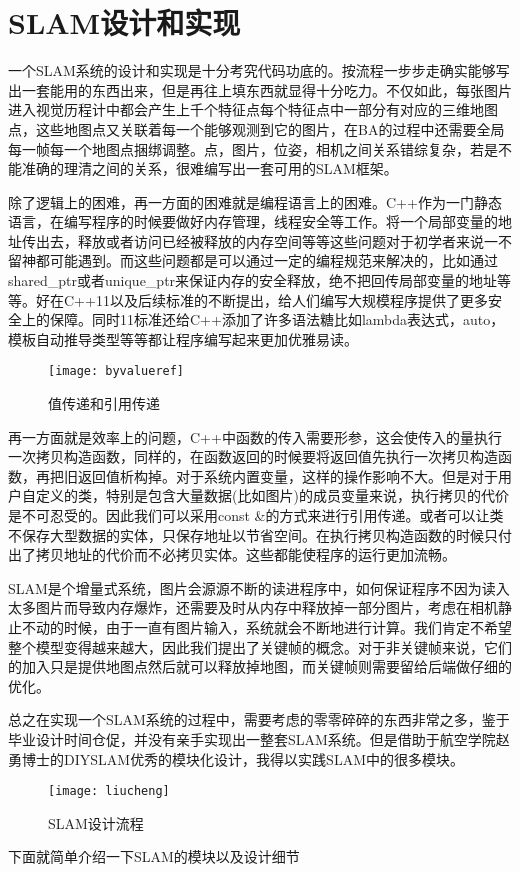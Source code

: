 \chapter{SLAM设计和实现}
一个SLAM系统的设计和实现是十分考究代码功底的。按流程一步步走确实能够写出一套能用的东西出来，但是再往上填东西就显得十分吃力。不仅如此，每张图片进入视觉历程计中都会产生上千个特征点每个特征点中一部分有对应的三维地图点，这些地图点又关联着每一个能够观测到它的图片，在BA的过程中还需要全局每一帧每一个地图点捆绑调整。点，图片，位姿，相机之间关系错综复杂，若是不能准确的理清之间的关系，很难编写出一套可用的SLAM框架。\par
除了逻辑上的困难，再一方面的困难就是编程语言上的困难。C++作为一门静态语言，在编写程序的时候要做好内存管理，线程安全等工作。将一个局部变量的地址传出去，释放或者访问已经被释放的内存空间等等这些问题对于初学者来说一不留神都可能遇到。而这些问题都是可以通过一定的编程规范来解决的，比如通过shared\_ptr或者unique\_ptr来保证内存的安全释放，绝不把回传局部变量的地址等等。好在C++11以及后续标准的不断提出，给人们编写大规模程序提供了更多安全上的保障。同时11标准还给C++添加了许多语法糖比如lambda表达式，auto，模板自动推导类型等等都让程序编写起来更加优雅易读。\par
\begin{figure}[H]
	\centering
	\texttt{[image: byvalueref]}
	\caption{值传递和引用传递}
\end{figure}
再一方面就是效率上的问题，C++中函数的传入需要形参，这会使传入的量执行一次拷贝构造函数，同样的，在函数返回的时候要将返回值先执行一次拷贝构造函数，再把旧返回值析构掉。对于系统内置变量，这样的操作影响不大。但是对于用户自定义的类，特别是包含大量数据(比如图片)的成员变量来说，执行拷贝的代价是不可忍受的。因此我们可以采用const \&的方式来进行引用传递。或者可以让类不保存大型数据的实体，只保存地址以节省空间。在执行拷贝构造函数的时候只付出了拷贝地址的代价而不必拷贝实体。这些都能使程序的运行更加流畅。\par
SLAM是个增量式系统，图片会源源不断的读进程序中，如何保证程序不因为读入太多图片而导致内存爆炸，还需要及时从内存中释放掉一部分图片，考虑在相机静止不动的时候，由于一直有图片输入，系统就会不断地进行计算。我们肯定不希望整个模型变得越来越大，因此我们提出了关键帧的概念。对于非关键帧来说，它们的加入只是提供地图点然后就可以释放掉地图，而关键帧则需要留给后端做仔细的优化。\par
总之在实现一个SLAM系统的过程中，需要考虑的零零碎碎的东西非常之多，鉴于毕业设计时间仓促，并没有亲手实现出一整套SLAM系统。但是借助于航空学院赵勇博士的DIYSLAM\cite{zhao2019gslam}优秀的模块化设计，我得以实践SLAM中的很多模块。\par
\begin{figure}[H]
	\texttt{[image: liucheng]}
	\caption{SLAM设计流程}
\end{figure}
下面就简单介绍一下SLAM的模块以及设计细节

